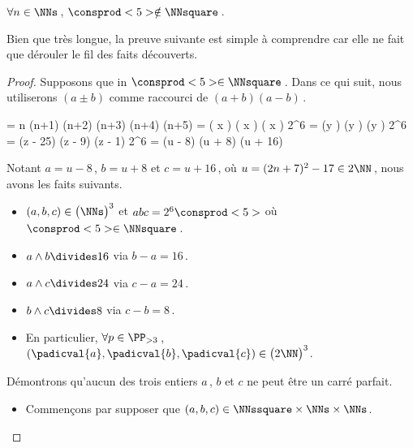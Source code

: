\begin{fact} \label{case-6}
	 $\forall n \in \NNs$\,, $\consprod<5> \notin \NNsquare$\,.
\end{fact}



Bien que très longue, la preuve suivante est simple à comprendre car elle ne fait que dérouler le fil des faits découverts.

\begin{proof}
    Supposons que in $\consprod<5> \in \NNsquare$\,. Dans ce qui suit, nous utiliserons $(a \pm b)$ comme raccourci de $(a + b) (a - b)$\,.

    \medskip
    \begin{stepcalc}[style = ar*, ope = \iff]
    	 = 
			n (n+1) (n+2) (n+3) (n+4) (n+5)
    	\consprod<5> = 
			\big( x \pm {} \big) \big( x \pm {} \big) \big( x \pm {} \big) 
    	2^6 \consprod<5> = 
			(y ) (y ) (y )
    	2^6 \consprod<5> = 
			(z - 25) (z - 9) (z - 1) 
    	2^6 \consprod<5> = 
			(u - 8) (u + 8) (u + 16)
    \end{stepcalc}

    \medskip
    Notant $a = u - 8$\,, $b = u + 8$ et $c = u + 16$\,, où $u = (2 n + 7)^2 - 17 \in 2 \NN$\,, nous avons les faits suivants.
    
    \begin{itemize}
		\item $(a, b, c) \in \big( \NNs \big)^3$ et $abc = 2^6 \consprod<5>$ où $\consprod<5> \in \NNsquare$\,.

		\item $a \wedge b \divides 16$ via $b - a = 16$\,.

		\item $a \wedge c \divides 24$ via $c - a = 24$\,.

		\item $b \wedge c \divides 8$  via $c - b = 8$\,.

		\item En particulier, 
		$\forall p \in \PP_{>3}$\,, 
		$(\padicval{a}, \padicval{b}, \padicval{c}) \in \big( 2 \NN \big)^3$.
	\end{itemize}


	Démontrons qu'aucun des trois entiers $a$\,, $b$ et $c$ ne peut être un carré parfait.
	\begin{itemize}
		\medskip
		\item Commençons par supposer que $(a, b, c) \in \NNssquare \times \NNs \times \NNs$. 
		

\end{itemize}
\end{proof}
